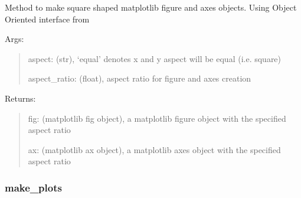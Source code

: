 \documentclass[letterpaper,10pt,english]{sphinxmanual}
\begin{document}
\begin{fulllineitems}
\label{\detokenize{api/mastml.plots.make_fig_ax_square:mastml.plots.make_fig_ax_square}}
Method to make square shaped matplotlib figure and axes objects. Using Object Oriented interface from


Args:
\begin{quote}

aspect: (str), ‘equal’ denotes x and y aspect will be equal (i.e. square)

aspect\_ratio: (float), aspect ratio for figure and axes creation
\end{quote}

Returns:
\begin{quote}

fig: (matplotlib fig object), a matplotlib figure object with the specified aspect ratio

ax: (matplotlib ax object), a matplotlib axes object with the specified aspect ratio
\end{quote}

\end{fulllineitems}



\subsubsection{make\_plots}
\label{\detokenize{api/mastml.plots.make_plots:make-plots}}\label{\detokenize{api/mastml.plots.make_plots::doc}}
\end{document}
